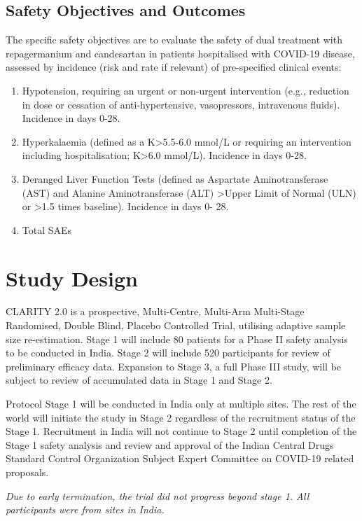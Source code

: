\documentclass[11pt,parskip=half-]{scrartcl}
\begin{document}
\subsection{Safety Objectives and Outcomes}
The specific safety objectives are to evaluate the safety of dual treatment with repagermanium and candesartan in patients hospitalised with COVID-19 disease, assessed by incidence (risk and rate if relevant) of pre-specified clinical events:

\begin{enumerate}[resume]
    \item Hypotension, requiring an urgent or non-urgent intervention (e.g., reduction in dose or cessation of anti-hypertensive, vasopressors, intravenous fluids). Incidence in days 0-28.
    \item  Hyperkalaemia (defined as a K>5.5-6.0 mmol/L or requiring an intervention including hospitalisation; K>6.0 mmol/L). Incidence in days 0-28.
    \item Deranged Liver Function Tests (defined as Aspartate Aminotransferase (AST) and Alanine Aminotransferase (ALT) >Upper Limit of Normal (ULN) or >1.5 times baseline). Incidence in days 0- 28.
    \item Total SAEs
\end{enumerate}

\clearpage

\section{Study Design}
CLARITY 2.0 is a prospective, Multi-Centre, Multi-Arm Multi-Stage Randomised, Double Blind, Placebo Controlled Trial, utilising adaptive sample size re-estimation. Stage 1 will include 80 patients for a Phase II safety analysis to be conducted in India. Stage 2 will include 520 participants for review of preliminary efficacy data. Expansion to Stage 3, a full Phase III study, will be subject to review of accumulated data in Stage 1 and Stage 2.

Protocol Stage 1 will be conducted in India only at multiple sites. The rest of the world will initiate the study in Stage 2 regardless of the recruitment status of the Stage 1. Recruitment in India will not continue to Stage 2 until completion of the Stage 1 safety analysis and review and approval of the Indian Central Drugs Standard Control Organization Subject Expert Committee on COVID-19 related proposals.

\textit{Due to early termination, the trial did not progress beyond stage 1. All participants were from sites in India.}
\end{document}

